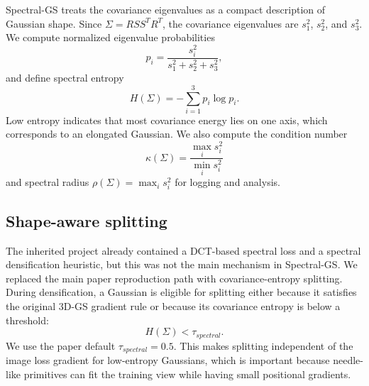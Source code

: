 \documentclass{article}
\begin{document}
Spectral-GS treats the covariance eigenvalues as a compact description of Gaussian shape. Since $\Sigma=R S S^T R^T$, the covariance eigenvalues are $s_1^2$, $s_2^2$, and $s_3^2$. We compute normalized eigenvalue probabilities
\begin{equation}
    p_i=\frac{s_i^2}{s_1^2+s_2^2+s_3^2},
\end{equation}
and define spectral entropy
\begin{equation}
    H(\Sigma)=-\sum_{i=1}^{3}p_i\log p_i.
\end{equation}
Low entropy indicates that most covariance energy lies on one axis, which corresponds to an elongated Gaussian. We also compute the condition number
\begin{equation}
    \kappa(\Sigma)=\frac{\max_i s_i^2}{\min_i s_i^2}
\end{equation}
and spectral radius $\rho(\Sigma)=\max_i s_i^2$ for logging and analysis.

\subsection{Shape-aware splitting}

The inherited project already contained a DCT-based spectral loss and a spectral densification heuristic, but this was not the main mechanism in Spectral-GS. We replaced the main paper reproduction path with covariance-entropy splitting. During densification, a Gaussian is eligible for splitting either because it satisfies the original 3D-GS gradient rule or because its covariance entropy is below a threshold:
\begin{equation}
    H(\Sigma) < \tau_{spectral}.
\end{equation}
We use the paper default $\tau_{spectral}=0.5$. This makes splitting independent of the image loss gradient for low-entropy Gaussians, which is important because needle-like primitives can fit the training view while having small positional gradients.
\end{document}
